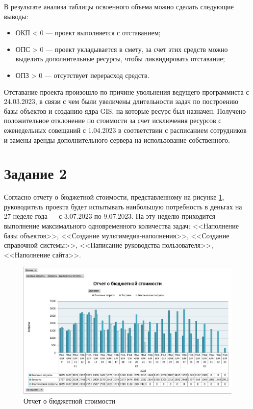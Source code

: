 В результате анализа таблицы освоенного объема можно сделать следующие выводы:

\begin{itemize}
	\item ОКП < 0 --- проект выполняется с отставанием;
	\item ОПС > 0 --- проект укладывается в смету, за счет этих средств можно выделить дополнительные ресурсы, чтобы ликвидировать отставание;
	\item ОПЗ > 0 --- отсутствует перерасход средств.
\end{itemize}

Отставание проекта произошло по причине увольнения ведущего программиста с 24.03.2023, в связи с чем были увеличены длительности задач по построению базы объектов и созданию ядра GIS, на которые ресурс был назначен. Получено положительное отклонение по стоимости за счет исключения ресурсов с еженедельных совещаний с 1.04.2023 в соответствии с расписанием сотрудников и замены аренды дополнительного сервера на использование собственного.

\section*{Задание 2}

Согласно отчету о бюджетной стоимости, представленному на рисунке \ref{img:budget-report}, руководитель проекта будет испытывать наибольшую потребность в деньгах на 27 неделе года --- с 3.07.2023 по 9.07.2023. На эту неделю приходится выполнение максимального одновременного количества задач: <<Наполнение базы объектов>>, <<Создание мультимедиа-наполнения>>, <<Создание справочной системы>>, <<Написание руководства пользователя>>, <<Наполнение сайта>>. 

\begin{figure}[H]
	\begin{center}
		\includegraphics[scale=0.6]{inc/img/budget-report.jpg}
	\end{center}
	\captionsetup{justification=centering}
	\caption{Отчет о бюджетной стоимости}
	\label{img:budget-report}
\end{figure}

